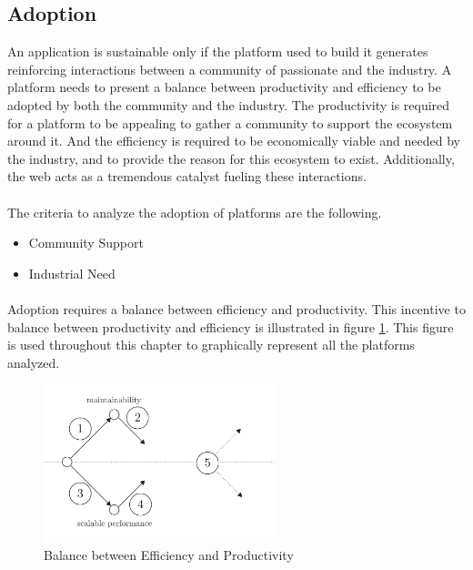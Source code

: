 \subsection{Adoption}

An application is sustainable only if the platform used to build it generates reinforcing interactions between a community of passionate and the industry.
A platform needs to present a balance between productivity and efficiency to be adopted by both the community and the industry.
The productivity is required for a platform to be appealing to gather a community to support the ecosystem around it.
And the efficiency is required to be economically viable and needed by the industry, and to provide the reason for this ecosystem to exist.
Additionally, the web acts as a tremendous catalyst fueling these interactions.

\paragraph{}

The criteria to analyze the adoption of platforms are the following.

\begin{itemize}
\item Community Support
\item Industrial Need
\end{itemize}

\paragraph{}

Adoption requires a balance between efficiency and productivity.
This incentive to balance between productivity and efficiency is illustrated in figure \ref{fig:state-of-the-art}.
This figure is used throughout this chapter to graphically represent all the platforms analyzed.

\begin{figure}[h!]
\begin{center}
\includegraphics[width=0.6\textwidth]{../ressources/state-of-the-art.pdf}
\end{center}
\caption{Balance between Efficiency and Productivity}
\label{fig:state-of-the-art}
\end{figure}


